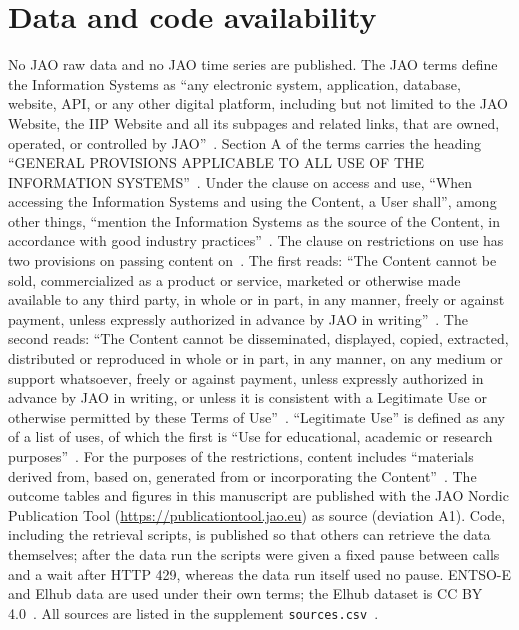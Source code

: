 \section{Data and code availability}
\label{sec:tilgang}

No JAO raw data and no JAO time series are published. %
The JAO terms define the Information Systems as ``any electronic system, application, database, website, API, or any other digital platform, including but not limited to the JAO Website, the IIP Website and all its subpages and related links, that are owned, operated, or controlled by JAO''~\cite{jaoterms}. %
Section A of the terms carries the heading ``GENERAL PROVISIONS APPLICABLE TO ALL USE OF THE INFORMATION SYSTEMS''~\cite{jaoterms}. %
Under the clause on access and use, ``When accessing the Information Systems and using the Content, a User shall'', among other things, ``mention the Information Systems as the source of the Content, in accordance with good industry practices''~\cite{jaoterms}. %
The clause on restrictions on use has two provisions on passing content on~\cite{jaoterms}.
The first reads: ``The Content cannot be sold, commercialized as a product or service, marketed or otherwise made available to any third party, in whole or in part, in any manner, freely or against payment, unless expressly authorized in advance by JAO in writing''~\cite{jaoterms}. %
The second reads: ``The Content cannot be disseminated, displayed, copied, extracted, distributed or reproduced in whole or in part, in any manner, on any medium or support whatsoever, freely or against payment, unless expressly authorized in advance by JAO in writing, or unless it is consistent with a Legitimate Use or otherwise permitted by these Terms of Use''~\cite{jaoterms}. %
``Legitimate Use'' is defined as any of a list of uses, of which the first is ``Use for educational, academic or research purposes''~\cite{jaoterms}. %
For the purposes of the restrictions, content includes ``materials derived from, based on, generated from or incorporating the Content''~\cite{jaoterms}. %
The outcome tables and figures in this manuscript are published with the JAO Nordic Publication Tool (\url{https://publicationtool.jao.eu}) as source (deviation A1). %
Code, including the retrieval scripts, is published so that others can retrieve the data themselves; after the data run the scripts were given a fixed pause between calls and a wait after HTTP 429, whereas the data run itself used no pause. %
ENTSO-E and Elhub data are used under their own terms; the Elhub dataset is CC BY 4.0~\cite{elhub}. %
All sources are listed in the supplement \texttt{sources.csv}~\cite{sources}.

